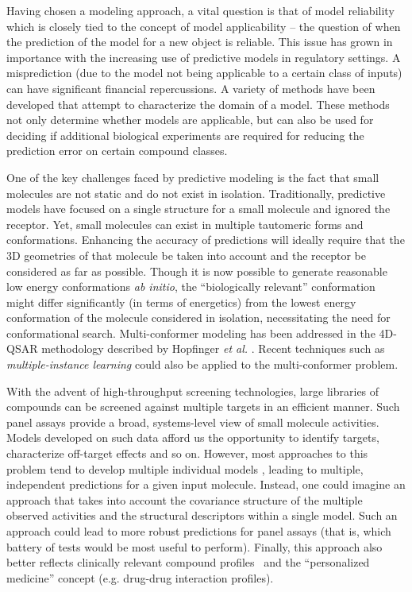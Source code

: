 \documentclass{sig-alternate}
\begin{document}
Having chosen a modeling approach, a vital question is that of model
reliability which is closely tied to the concept of model
applicability -- the question of when the prediction of the model for
a new object is reliable. This issue has grown in importance with the
increasing use of predictive models in regulatory settings. A
misprediction (due to the model not being applicable to a certain class
of inputs) can have significant financial repercussions. A variety of
methods have been developed that attempt to characterize the domain of
a model. These methods not only determine whether models are
applicable, but can also be used for deciding if additional biological
experiments are required for reducing the prediction error on certain
compound classes.

One of the key challenges faced by predictive modeling is the fact
that small molecules are not static and do not exist in isolation.
Traditionally, predictive models have focused on a single structure
for a small molecule and ignored the receptor. Yet, small molecules
can exist in multiple tautomeric forms and conformations.  Enhancing
the accuracy of predictions will ideally require that the 3D
geometries of that molecule be taken into account and the receptor be
considered as far as possible.  Though it is now possible to generate
reasonable low energy conformations \emph{ab initio}, the
``biologically relevant'' conformation might differ significantly (in
terms of energetics) from the lowest energy conformation of the
molecule considered in isolation, necessitating the need for
conformational search.  Multi-conformer modeling has been addressed in
the 4D-QSAR methodology described by Hopfinger \textit{et al.}
\cite{Albuquerque:1998ys}.  Recent techniques such as
\emph{multiple-instance learning} could also be applied to the
multi-conformer problem.

With the advent of high-throughput screening technologies, large
libraries of compounds can be screened against multiple targets in an
efficient manner. Such panel assays provide a broad, systems-level
view of small molecule activities.  Models developed on such data
afford us the opportunity to identify targets, characterize off-target
effects and so on. However, most approaches to this problem tend to
develop multiple individual models \cite{Chen:2010zr}, leading to
multiple, independent predictions for a given input molecule.
Instead, one could imagine an approach that takes into account the
covariance structure of the multiple observed activities and the
structural descriptors within a single model. Such an approach could
lead to more robust predictions for panel assays (that is, which
battery of tests would be most useful to perform). Finally, this
approach also better reflects clinically relevant compound
profiles~\cite{kuhn2010} and the ``personalized medicine'' concept
(e.g. drug-drug interaction profiles).
\end{document}

